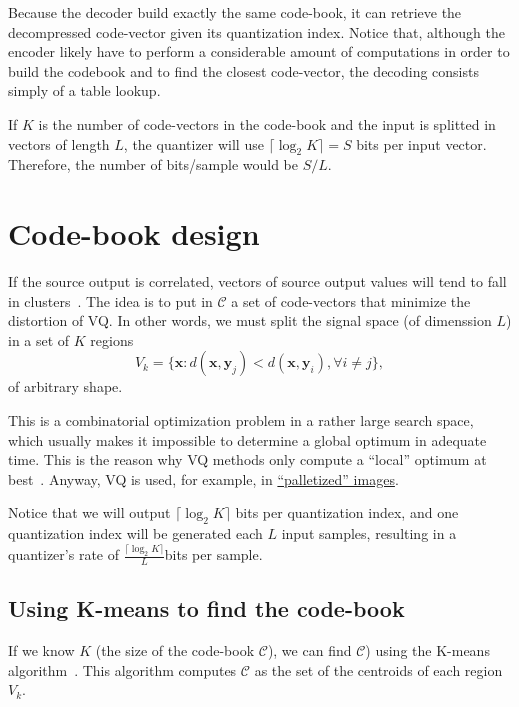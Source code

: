 Because the decoder build exactly the same code-book, it can retrieve
the decompressed code-vector given its quantization index. Notice
that, although the encoder likely have to perform a considerable
amount of computations in order to build the codebook and to find the
closest code-vector, the decoding consists simply of a table lookup.

If $K$ is the number of code-vectors in the code-book and the input is
splitted in vectors of length $L$, the quantizer will use
$\lceil\log_2 K\rceil=S$ bits per input vector. Therefore, the number
of bits/sample would be $S/L$.


\section{Code-book design}

If the source output is correlated, vectors of source output values
will tend to fall in clusters~\cite{sayood2017introduction}. The idea
is to put in $\mathcal{C}$ a set of code-vectors that minimize the
distortion of VQ. In other words, we must split the signal space (of
dimenssion $L$) in a set of $K$ regions
\begin{equation}
  V_k=\{\mathbf{x}:d(\mathbf{x},\mathbf{y}_j) <
  d(\mathbf{x},\mathbf{y}_i), \forall i\ne j\},
\end{equation}
of arbitrary shape.

This is a combinatorial optimization problem in a rather large search
space, which usually makes it impossible to determine a global optimum
in adequate time. This is the reason why VQ methods only compute a
``local'' optimum at best~\cite{burger2016digital}. Anyway, VQ is
used, for example, in
\href{https://en.wikipedia.org/wiki/Palette_(computing)}{``palletized''
  images}.

Notice that we will output $\lceil\log_2 K\rceil$ bits per
quantization index, and one quantization index will be generated each
$L$ input samples, resulting in a quantizer's rate of
$\frac{\lceil\log_2 K\rceil}{L}$bits per sample.

  
\subsection{Using K-means to find the code-book}

If we know $K$ (the size of the code-book $\mathcal{C}$), we can find
$\mathcal{C}$) using the K-means
algorithm~\cite{hartigan1979algorithm,sayood2017introduction}. This
algorithm computes $\mathcal{C}$ as the set of the centroids of each
region $V_k$.

